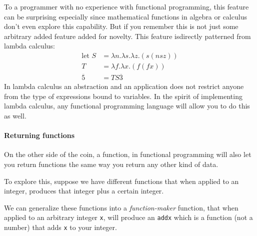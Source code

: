 To a programmer with no experience with functional programming, this
feature can be surprising especially since mathematical functions in
algebra or calculus don't even explore this capability. But if you
remember this is not just some arbitrary added feature added for
novelty. This feature isdirectly patterned from lambda calculus: \[
\begin{aligned}
\text{let } S &= \lambda n .\lambda s. \lambda z. (s(nsz))\\
T &= \lambda f. \lambda x. (f(fx))\\
\overline 5&=TS\overline{3}
\end{aligned}
\] In lambda calculus an abstraction and an application does not
restrict anyone from the type of expressions bound to variables. In the
spirit of implementing lambda calculus, any functional programming
language will allow you to do this as well.

\paragraph{Returning
functions}\label{functional-programming-paradigm.md__returning-functions}

On the other side of the coin, a function, in functional programming
will also let you return functions the same way you return any other
kind of data.

To explore this, suppose we have different functions that when applied
to an integer, produces that integer plus a certain integer.

\begin{Shaded}
\begin{Highlighting}[]
 \OtherTok{{-}\textgreater{}} 
\OtherTok{=}\OperatorTok{+} 

 \OtherTok{{-}\textgreater{}} 
\OtherTok{=}\OperatorTok{+} 

  \OtherTok{{-}\textgreater{}} 
\OtherTok{=}\OperatorTok{+} 
\end{Highlighting}
\end{Shaded}

We can generalize these functions into a \emph{function-maker} function,
that when applied to an arbitrary integer \texttt{x}, will produce an
\texttt{addx} which is a function (not a number) that adds \texttt{x} to
your integer.


